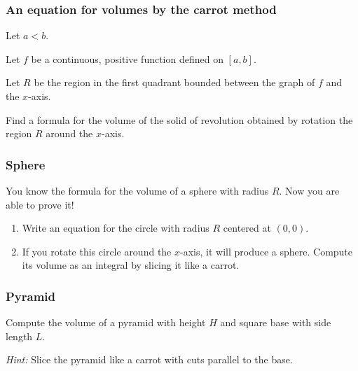 \documentclass[14pt]{beamer}
\date{}
\title{}
\author{}
\begin{document}


	\begin{frame}[t]
		\frametitle{An equation for volumes by the carrot method}

		Let $a < b$.

		Let $f$ be a continuous, positive function defined on $[a,b]$.

		Let $R$ be the region in the first quadrant bounded between the graph of $f$
		and the $x$-axis.

		Find a formula for the volume of the solid of revolution obtained by rotation
		the region $R$ around the $x$-axis.
	\end{frame}

	\begin{frame}[t]
		\frametitle{Sphere}

		You know the formula for the volume of a sphere with radius $R$. Now you are
		able to prove it!

		\begin{enumerate}
			\item Write an equation for the circle with radius $R$ centered at $(0,0)$.

			\item If you rotate this circle around the $x$-axis, it will produce a
				sphere. Compute its volume as an integral by slicing it like a carrot.
		\end{enumerate}
	\end{frame}

	\begin{frame}[t]
		\frametitle{Pyramid}

		Compute the volume of a pyramid with height $H$ and square base with side
		length $L$.

		\emph{Hint:} Slice the pyramid like a carrot with cuts parallel to the base.
	\end{frame}
\end{document}
